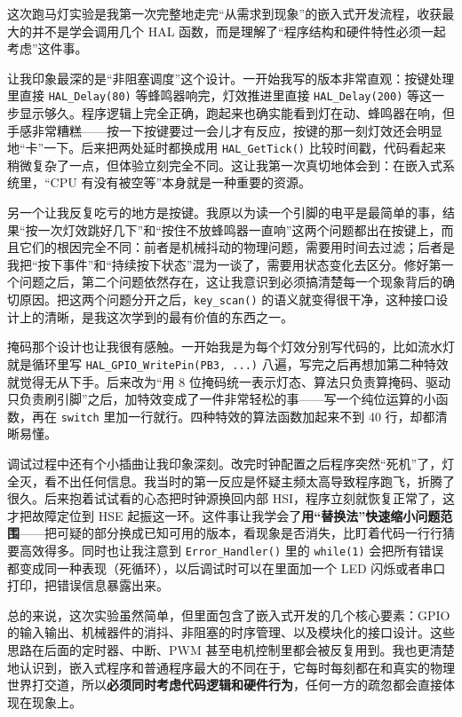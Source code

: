 \documentclass[UTF8,zihao=5,fontset=fandol]{ctexart}
\begin{document}
\begin{reportsection}{\ReflectionTitle}{\ReflectionHint}
  这次跑马灯实验是我第一次完整地走完“从需求到现象”的嵌入式开发流程，收获最大的并不是学会调用几个 HAL 函数，而是理解了“程序结构和硬件特性必须一起考虑”这件事。

  让我印象最深的是“非阻塞调度”这个设计。一开始我写的版本非常直观：按键处理里直接 \texttt{HAL\_Delay(80)} 等蜂鸣器响完，灯效推进里直接 \texttt{HAL\_Delay(200)} 等这一步显示够久。程序逻辑上完全正确，跑起来也确实能看到灯在动、蜂鸣器在响，但手感非常糟糕——按一下按键要过一会儿才有反应，按键的那一刻灯效还会明显地“卡”一下。后来把两处延时都换成用 \texttt{HAL\_GetTick()} 比较时间戳，代码看起来稍微复杂了一点，但体验立刻完全不同。这让我第一次真切地体会到：在嵌入式系统里，“CPU 有没有被空等”本身就是一种重要的资源。

  另一个让我反复吃亏的地方是按键。我原以为读一个引脚的电平是最简单的事，结果“按一次灯效跳好几下”和“按住不放蜂鸣器一直响”这两个问题都出在按键上，而且它们的根因完全不同：前者是机械抖动的物理问题，需要用时间去过滤；后者是我把“按下事件”和“持续按下状态”混为一谈了，需要用状态变化去区分。修好第一个问题之后，第二个问题依然存在，这让我意识到必须搞清楚每一个现象背后的确切原因。把这两个问题分开之后，\texttt{key\_scan()} 的语义就变得很干净，这种接口设计上的清晰，是我这次学到的最有价值的东西之一。

  掩码那个设计也让我很有感触。一开始我是为每个灯效分别写代码的，比如流水灯就是循环里写 \texttt{HAL\_GPIO\_WritePin(PB3, ...)} 八遍，写完之后再想加第二种特效就觉得无从下手。后来改为“用 8 位掩码统一表示灯态、算法只负责算掩码、驱动只负责刷引脚”之后，加特效变成了一件非常轻松的事——写一个纯位运算的小函数，再在 \texttt{switch} 里加一行就行。四种特效的算法函数加起来不到 40 行，却都清晰易懂。

  调试过程中还有个小插曲让我印象深刻。改完时钟配置之后程序突然“死机”了，灯全灭，看不出任何信息。我当时的第一反应是怀疑主频太高导致程序跑飞，折腾了很久。后来抱着试试看的心态把时钟源换回内部 HSI，程序立刻就恢复正常了，这才把故障定位到 HSE 起振这一环。这件事让我学会了\textbf{用“替换法”快速缩小问题范围}——把可疑的部分换成已知可用的版本，看现象是否消失，比盯着代码一行行猜要高效得多。同时也让我注意到 \texttt{Error\_Handler()} 里的 \texttt{while(1)} 会把所有错误都变成同一种表现（死循环），以后调试时可以在里面加一个 LED 闪烁或者串口打印，把错误信息暴露出来。

  总的来说，这次实验虽然简单，但里面包含了嵌入式开发的几个核心要素：GPIO 的输入输出、机械器件的消抖、非阻塞的时序管理、以及模块化的接口设计。这些思路在后面的定时器、中断、PWM 甚至电机控制里都会被反复用到。我也更清楚地认识到，嵌入式程序和普通程序最大的不同在于，它每时每刻都在和真实的物理世界打交道，所以\textbf{必须同时考虑代码逻辑和硬件行为}，任何一方的疏忽都会直接体现在现象上。

  \par\medskip\noindent \ReviewNote
\end{reportsection}
\end{document}
